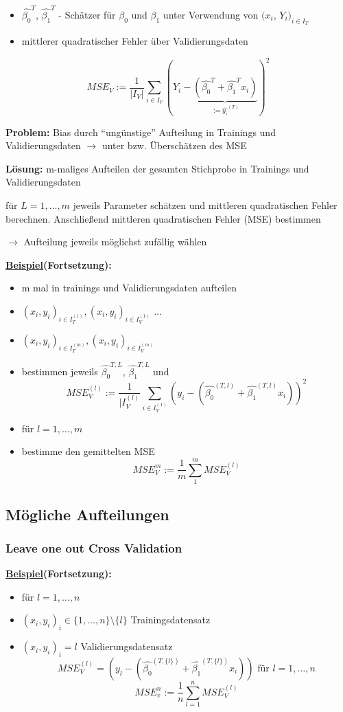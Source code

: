 \documentclass[10pt]{report}
\theoremstyle{definition}
\begin{document}
\begin{itemize}
	\item $ \hat{\beta_0}^T $, $ \hat{\beta_1}^T $ - Schätzer für $\beta_0$ und  $\beta_1$ unter Verwendung von $ (x_i $, $ Y_i $$ )_{i \in I_T} $
	\item mittlerer quadratischer Fehler über Validierungsdaten
\end{itemize}

\[MSE_V := \frac{1}{|I_V|} \sum_{i \in I_V}(Y_i - \underbrace{(  \hat{\beta_0}^T +  \hat{\beta_1}^T x_i)}_{:= \hat{y_i}^{(T)}})^2\]

\textbf{Problem:} Bias durch "`ungünstige"' Aufteilung in Trainings und Validierungsdaten $\rightarrow$
unter bzw. Überschätzen des MSE

\textbf{Lösung:} m-maliges Aufteilen der gesamten Stichprobe in Trainings und Validierungsdaten

für \(L=1,\ldots, m\) jeweils Parameter schätzen und mittleren quadratischen Fehler berechnen. Anschließend mittleren quadratischen Fehler (MSE) bestimmen

$\rightarrow$ Aufteilung jeweils möglichst zufällig wählen

\textbf{\underline{Beispiel}(Fortsetzung):}
\begin{itemize}
	\item m mal in trainings und Validierungsdaten aufteilen
	\item $ (x_i, y_i)_{i \in I_T^{(1)}} , (x_i,y_i)_{i \in I_V^{(1)}} $ $ \ldots $
	\item $ (x_i, y_i)_{i \in I_T^{(m)} }, (x_i,y_i)_{i \in I_V^{(m)}} $
	\item bestimmen jeweils  $\hat{\beta_0}^{T,L}$, $\hat{\beta_1}^{T,L}$ und 
	\[ MSE_V^{(l)} := \frac{1}{|I_V^{(l)}} \sum_{i \in I_V^{(1)}}(y_i - (\hat{\beta_0}^{(T,l)} + \hat{\beta_1}^{(T,l)} x_i))^2  \]
	\item für $l = 1, \ldots, m$
	\item bestimme den gemittelten MSE
	\[MSE_V^m := \frac{1}{m} \sum_{1}^{m} MSE_V^{(l)}\]
\end{itemize}

\subsection{Mögliche Aufteilungen}
\subsubsection{Leave one out Cross Validation}
\textbf{\underline{Beispiel}(Fortsetzung):}
\begin{itemize}
	\item für \(l = 1,\ldots,n\) 
	\item $(x_i, y_i)_i \in \{1, \ldots, n \} \setminus \{l\}$ Trainingsdatensatz
	\item $(x_i, y_i)_i = l$ Validierungsdatensatz
	\[MSE_V^{(l)} = (y_l - (\hat{\beta_0}^{(T, \{l\})} + \hat{\beta_1}^{(T, \{l\})} x_i)) \text{ für } l = 1,\ldots ,n\]	
	\[MSE_v^n := \frac{1}{n}\sum_{l = 1}^{n} MSE_V^{(l)}\]
\end{itemize}
\end{document}
